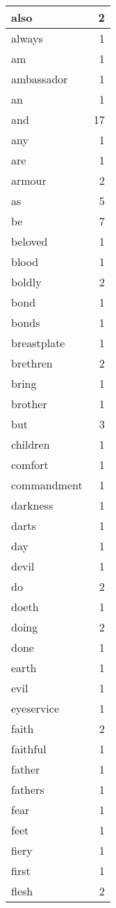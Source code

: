 \begin{center}
\begin{longtable}{l|r}
also & 2\\ \hline 
always & 1\\ \hline 
am & 1\\ \hline 
ambassador & 1\\ \hline 
an & 1\\ \hline 
and & 17\\ \hline 
any & 1\\ \hline 
are & 1\\ \hline 
armour & 2\\ \hline 
as & 5\\ \hline 
be & 7\\ \hline 
beloved & 1\\ \hline 
blood & 1\\ \hline 
boldly & 2\\ \hline 
bond & 1\\ \hline 
bonds & 1\\ \hline 
breastplate & 1\\ \hline 
brethren & 2\\ \hline 
bring & 1\\ \hline 
brother & 1\\ \hline 
but & 3\\ \hline 
children & 1\\ \hline 
comfort & 1\\ \hline 
commandment & 1\\ \hline 
darkness & 1\\ \hline 
darts & 1\\ \hline 
day & 1\\ \hline 
devil & 1\\ \hline 
do & 2\\ \hline 
doeth & 1\\ \hline 
doing & 2\\ \hline 
done & 1\\ \hline 
earth & 1\\ \hline 
evil & 1\\ \hline 
eyeservice & 1\\ \hline 
faith & 2\\ \hline 
faithful & 1\\ \hline 
father & 1\\ \hline 
fathers & 1\\ \hline 
fear & 1\\ \hline 
feet & 1\\ \hline 
fiery & 1\\ \hline 
first & 1\\ \hline 
flesh & 2\\ \hline 

\end{longtable}
\end{center}
